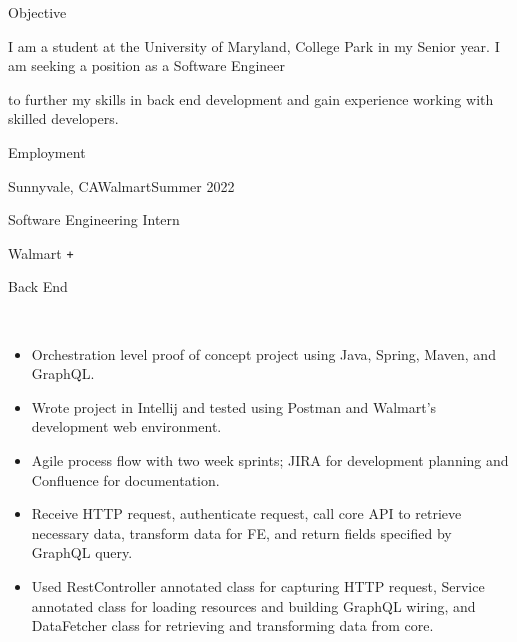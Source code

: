 \documentclass[]{mcdowellcv}
\begin{document}
	\makeheader
	
  \begin{cvsection}{Objective}
    
    \begin{cvsubsection}{}{}{}
      \iftrue
      I am a student at the University of Maryland, College Park in my Senior year. I am seeking a position as a Software Engineer %
      \fi
      \iffalse
      at AT\&T %
      \fi
      \iftrue
      to further my skills in back end development and gain experience working with skilled developers.
      \fi
    \end{cvsubsection}
    
  \end{cvsection}

  \begin{cvsection}{Employment}
    \begin{cvsubsection}{Sunnyvale, CA}{Walmart}{Summer 2022}
      \begin{center}
        \begin{itemize*}
          \item Software Engineering Intern
          \item Walmart \texttt{+}
          \item Back End
          \item ~
        \end{itemize*}
      \end{center}
      \begin{itemize}
        \item Orchestration level proof of concept project using Java, Spring, Maven, and GraphQL.
        \item Wrote project in Intellij and tested using Postman and Walmart's development web environment.
        \item Agile process flow with two week sprints; JIRA for development planning and Confluence for documentation.
        \item Receive HTTP request, authenticate request, call core API to retrieve necessary data, transform data for FE, %
        and return fields specified by GraphQL query.
        \item Used RestController annotated class for capturing HTTP request, Service annotated class for loading resources %
        and building GraphQL wiring, and DataFetcher class for retrieving and transforming data from core.
      \end{itemize}
    \end{cvsubsection} 
  \end{cvsection}
\end{document}

